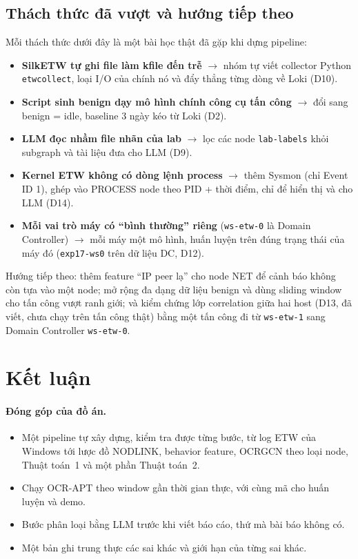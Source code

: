 \subsection{Thách thức đã vượt và hướng tiếp theo}
\label{sec:challenges}
Mỗi thách thức dưới đây là một bài học thật đã gặp khi dựng pipeline:
\begin{itemize}
    \item \textbf{SilkETW tự ghi file làm kfile đến trễ} $\rightarrow$ nhóm tự viết collector Python \texttt{etwcollect}, loại I/O của chính nó và đẩy thẳng từng dòng về Loki (D10).
    \item \textbf{Script sinh benign dạy mô hình chính công cụ tấn công} $\rightarrow$ đổi sang benign = idle, baseline 3 ngày kéo từ Loki (D2).
    \item \textbf{LLM đọc nhầm file nhãn của lab} $\rightarrow$ lọc các node \texttt{lab-labels} khỏi subgraph và tài liệu đưa cho LLM (D9).
    \item \textbf{Kernel ETW không có dòng lệnh process} $\rightarrow$ thêm Sysmon (chỉ Event ID 1), ghép vào PROCESS node theo PID + thời điểm, chỉ để hiển thị và cho LLM (D14).
    \item \textbf{Mỗi vai trò máy có ``bình thường'' riêng} (\texttt{ws-etw-0} là Domain Controller) $\rightarrow$ mỗi máy một mô hình, huấn luyện trên đúng trạng thái của máy đó (\texttt{exp17-ws0} trên dữ liệu DC, D12).
\end{itemize}
Hướng tiếp theo: thêm feature ``IP peer lạ'' cho node NET để cảnh báo không còn tựa vào một node; mở rộng đa dạng dữ liệu benign và dùng sliding window cho tấn công vượt ranh giới; và kiểm chứng lớp correlation giữa hai host (D13, đã viết, chưa chạy trên tấn công thật) bằng một tấn công đi từ \texttt{ws-etw-1} sang Domain Controller \texttt{ws-etw-0}.

\section{Kết luận}
\label{sec:conclusion}

\paragraph{Đóng góp của đồ án.}
\begin{itemize}
    \item Một pipeline tự xây dựng, kiểm tra được từng bước, từ log ETW của Windows tới lược đồ NODLINK, behavior feature, OCRGCN theo loại node, Thuật toán~1 và một phần Thuật toán~2.
    \item Chạy OCR-APT theo window gần thời gian thực, với cùng mã cho huấn luyện và demo.
    \item Bước phân loại bằng LLM trước khi viết báo cáo, thứ mà bài báo không có.
    \item Một bản ghi trung thực các sai khác và giới hạn của từng sai khác.
\end{itemize}

